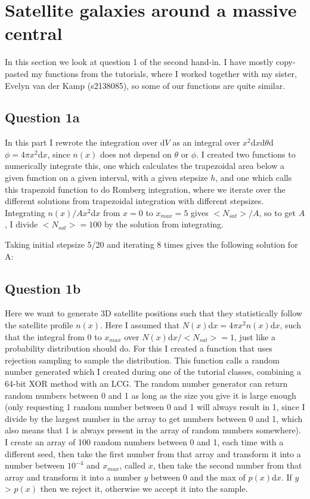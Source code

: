 \section{Satellite galaxies around a massive central}

In this section we look at question 1 of the second hand-in. 
I have mostly copy-pasted my functions from the tutorials, where I worked together with my sister,
Evelyn van der Kamp (s2138085), so some of our functions are quite similar.



\subsection{Question 1a}

In this part I rewrote the integration over d$V$ as an integral over $x^2$d$x$d$\theta$d$\phi = 4\pi x^2$d$x$, since $n(x)$ does not depend on $\theta$ or $\phi$. 
I created two functions to numerically integrate this, one which calculates the trapezoidal area below a given function on a given interval, with a given stepsize $h$, and one which calls this trapezoid function to do Romberg integration, where we iterate over the different solutions from trapezoidal integration with different stepsizes.
Integrating $n(x)/A x^2$d$x$ from $x = 0$ to $x_{max} = 5$ gives $<N_{sat}>/A$, so to get $A$, I divide $<N_{sat}> = 100$ by the solution from integrating. 

Taking initial stepsize 5/20 and iterating 8 times gives the following solution for A:




\subsection{Question 1b}

Here we want to generate 3D satellite positions such that they statistically follow the satellite profile $n(x)$.
Here I assumed that $N(x)$d$x = 4\pi x^2 n(x)$d$x$, such that the integral from 0 to $x_{max}$ over $N(x)$d$x/<N_{sat}> = 1$, just like a probability distribution should do.
For this I created a function that uses rejection sampling to sample the distribution.
This function calls a random number generated which I created during one of the tutorial classes, combining a 64-bit XOR method with an LCG.
The random number generator can return random numbers between 0 and 1 as long as the size you give it is large enough (only requesting 1 random number between 0 and 1 will always result in 1, since I divide by the largest number in the array to get numbers between 0 and 1, which also means that 1 is always present in the array of random numbers somewhere).
I create an array of 100 random numbers between 0 and 1, each time with a different seed, then take the first number from that array and transform it into a number between $10^{-4}$ and $x_{max}$, called $x$, then take the second number from that array and transform it into a number $y$ between 0 and the max of $p(x)$d$x$.
If $y$ > $p(x)$ then we reject it, otherwise we accept it into the sample.

